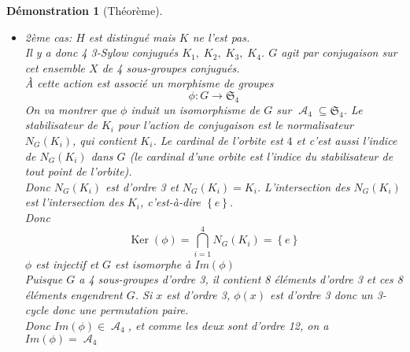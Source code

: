 \documentclass[a4paper, oneside]{report}
\theoremstyle{break}
\newtheorem{remarque}[thm]{Remarque}
\newtheorem*{demonstration}{Démonstration}
\DeclareMathOperator{\A}{\mathcal{A}}
\renewcommand{\S}{\mathfrak{S}}
\DeclarePairedDelimiter\ens{\left\{ }{\right\} }%
\DeclareMathOperator{\Ker}{Ker}
\renewcommand{\ens}[1]{\left\{ #1 \right\} }%
\begin{document}
\begin{demonstration}[Théorème]
\begin{itemize}
\begin{remarque}
On verra que ce sont les seuls groupes abéliens d'ordre 12.
\end{remarque}

\item 2ème cas: $H$ est distingué mais $K$ ne l'est pas.\\
Il y a donc 4 3-Sylow conjugués $K_1, \; K_2, \; K_3, \; K_4$. $G$ agit par conjugaison sur cet ensemble $X$ de 4 sous-groupes conjugués.\\
À cette action est associé un morphisme de groupes
\[
\phi : G \longrightarrow \mathfrak{S}_4
\]
On va montrer que $\phi$ induit un isomorphisme de $G$ sur $\A_4 \subseteq \S_4$. Le stabilisateur de $K_i$ pour l'action de conjugaison est le normalisateur $N_G(K_i)$, qui contient $K_i$. Le cardinal de l'orbite est $4$ et c'est aussi l'indice de $N_G(K_i)$ dans $G$ (le cardinal d'une orbite est l'indice du stabilisateur de tout point de l'orbite).\\
Donc $N_G(K_i)$ est d'ordre 3 et $N_G(K_i) = K_i$. L'intersection des $N_G(K_i)$ est l'intersection des $K_i$, c'est-à-dire $\ens{e}$.\\
Donc 
\[
\Ker(\phi) = \bigcap_{i = 1}^4 N_G(K_i) = \ens{e}
\]
$\phi$ est injectif et $G$ est isomorphe à $Im(\phi)$\\
Puisque $G$ a 4 sous-groupes d'ordre 3, il contient 8 éléments d'ordre 3 et ces 8 éléments engendrent $G$. Si $x$ est d'ordre 3, $\phi(x)$ est d'ordre 3 donc un 3-cycle donc une permutation paire.\\
Donc $Im(\phi) \in \A_4$, et comme les deux sont d'ordre 12, on a $Im(\phi) = \A_4$


\end{itemize}
\end{demonstration}
\end{document}

